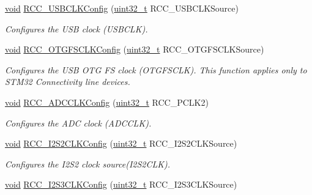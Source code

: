\begin{DoxyCompactItemize}
\hyperlink{group___n_a_m_e_ga18028b8badbf1ea7e704ccac3c488e82}{void} \hyperlink{group___r_c_c___exported___functions_ga895b3ff3d143c990f1cd0146aa260081}{R\-C\-C\-\_\-\-U\-S\-B\-C\-L\-K\-Config} (\hyperlink{stdint_8h_a435d1572bf3f880d55459d9805097f62}{uint32\-\_\-t} R\-C\-C\-\_\-\-U\-S\-B\-C\-L\-K\-Source)
\begin{DoxyCompactList}\small\item\em Configures the U\-S\-B clock (U\-S\-B\-C\-L\-K). \end{DoxyCompactList}\item 
\hyperlink{group___n_a_m_e_ga18028b8badbf1ea7e704ccac3c488e82}{void} \hyperlink{group___r_c_c___exported___functions_ga632823c9abe8c696c265302b6f49269c}{R\-C\-C\-\_\-\-O\-T\-G\-F\-S\-C\-L\-K\-Config} (\hyperlink{stdint_8h_a435d1572bf3f880d55459d9805097f62}{uint32\-\_\-t} R\-C\-C\-\_\-\-O\-T\-G\-F\-S\-C\-L\-K\-Source)
\begin{DoxyCompactList}\small\item\em Configures the U\-S\-B O\-T\-G F\-S clock (O\-T\-G\-F\-S\-C\-L\-K). This function applies only to S\-T\-M32 Connectivity line devices. \end{DoxyCompactList}\item 
\hyperlink{group___n_a_m_e_ga18028b8badbf1ea7e704ccac3c488e82}{void} \hyperlink{group___r_c_c___exported___functions_gadda89cdb838bf49e5fa10f3f774530a4}{R\-C\-C\-\_\-\-A\-D\-C\-C\-L\-K\-Config} (\hyperlink{stdint_8h_a435d1572bf3f880d55459d9805097f62}{uint32\-\_\-t} R\-C\-C\-\_\-\-P\-C\-L\-K2)
\begin{DoxyCompactList}\small\item\em Configures the A\-D\-C clock (A\-D\-C\-C\-L\-K). \end{DoxyCompactList}\item 
\hyperlink{group___n_a_m_e_ga18028b8badbf1ea7e704ccac3c488e82}{void} \hyperlink{group___r_c_c___exported___functions_ga9d6a57372fa5a230ab247897115d7d2c}{R\-C\-C\-\_\-\-I2\-S2\-C\-L\-K\-Config} (\hyperlink{stdint_8h_a435d1572bf3f880d55459d9805097f62}{uint32\-\_\-t} R\-C\-C\-\_\-\-I2\-S2\-C\-L\-K\-Source)
\begin{DoxyCompactList}\small\item\em Configures the I2\-S2 clock source(\-I2\-S2\-C\-L\-K). \end{DoxyCompactList}\item 
\hyperlink{group___n_a_m_e_ga18028b8badbf1ea7e704ccac3c488e82}{void} \hyperlink{group___r_c_c___exported___functions_ga69d22a0a9a61c7cfd025c1aa391da4b3}{R\-C\-C\-\_\-\-I2\-S3\-C\-L\-K\-Config} (\hyperlink{stdint_8h_a435d1572bf3f880d55459d9805097f62}{uint32\-\_\-t} R\-C\-C\-\_\-\-I2\-S3\-C\-L\-K\-Source)

\end{DoxyCompactItemize}
